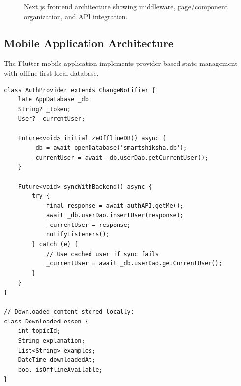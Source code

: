 \documentclass[10pt,conference,compsocconf]{IEEEtran}
\begin{document}
\begin{figure}[h]
\centering
{}
\caption{Next.js frontend architecture showing middleware, page/component organization, and API integration.}
\label{fig:frontend_arch}
\end{figure}

\subsection{Mobile Application Architecture}

The Flutter mobile application implements provider-based state management with offline-first local database.

\begin{lstlisting}[caption=Flutter Offline-First Architecture, label=lst:flutter]
class AuthProvider extends ChangeNotifier {
    late AppDatabase _db;
    String? _token;
    User? _currentUser;
    
    Future<void> initializeOfflineDB() async {
        _db = await openDatabase('smartshiksha.db');
        _currentUser = await _db.userDao.getCurrentUser();
    }
    
    Future<void> syncWithBackend() async {
        try {
            final response = await authAPI.getMe();
            await _db.userDao.insertUser(response);
            _currentUser = response;
            notifyListeners();
        } catch (e) {
            // Use cached user if sync fails
            _currentUser = await _db.userDao.getCurrentUser();
        }
    }
}

// Downloaded content stored locally:
class DownloadedLesson {
    int topicId;
    String explanation;
    List<String> examples;
    DateTime downloadedAt;
    bool isOfflineAvailable;
}
\end{lstlisting}
\end{document}
